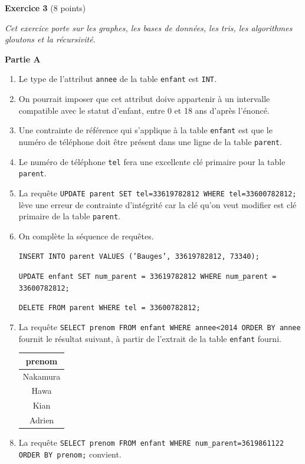 \documentclass[11pt,a4paper]{article}
\begin{document}
\textbf{Exercice 3} (8 points)

\medskip

\textit{Cet exercice porte sur les graphes, les bases de données, les tris, les algorithmes
gloutons et la récursivité.}

\textbf{Partie A}

\begin{enumerate}
\item Le type de l'attribut \texttt{annee} de la table \texttt{enfant} est \texttt{INT}.
\item On pourrait imposer que cet attribut doive appartenir à un intervalle compatible avec le statut d'enfant, entre 0 et 18 ans d'après l'énoncé.
\item Une contrainte de référence qui s'applique à la table \texttt{enfant} est que le numéro de téléphone doit être présent dans une ligne de la table \texttt{parent}.
\item Le numéro de téléphone \texttt{tel} fera une excellente clé primaire pour la table \texttt{parent}.
\item La requête \texttt{UPDATE parent SET tel=33619782812 WHERE tel=33600782812;} lève une erreur de contrainte d'intégrité car la clé qu'on veut modifier est clé primaire de la table \texttt{parent}.

\item On complète la séquence de requêtes.

\texttt{INSERT INTO parent VALUES ('Bauges', 33619782812, 73340);}

\texttt{UPDATE enfant SET num\_parent = 33619782812 WHERE num\_parent = 33600782812;}


\texttt{DELETE FROM parent WHERE tel = 33600782812;}


\item La requête \texttt{SELECT prenom FROM enfant WHERE annee<2014 ORDER BY annee} fournit le résultat suivant, à partir de l'extrait de la table \texttt{enfant} fourni.

\begin{center}
\begin{tabular}{|c|}
\hline
prenom\\
\hline
Nakamura\\
Hawa\\
Kian\\
Adrien\\
\hline
\end{tabular}
\end{center}


\item La requête \texttt{SELECT prenom FROM enfant WHERE num\_parent=3619861122 ORDER BY prenom;} convient.


\end{enumerate}
\end{document}
